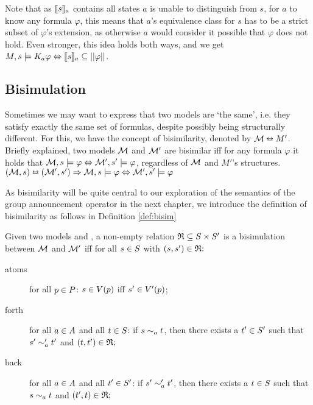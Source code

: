  Note that as $\llbracket s\rrbracket_a$ contains all states $a$ is unable to distinguish from $s$, for $a$ to know any formula $\varphi$, this means that $a$'s equivalence class for $s$ has to be a strict subset of $\varphi$'s extension, as otherwise $a$ would consider it possible that $\varphi$ does not hold. Even stronger, this idea holds both ways, and we get $M,s\models K_a\varphi \Leftrightarrow \llbracket s\rrbracket_a \subseteq ||\varphi||$.

\subsection{Bisimulation}

Sometimes we may want to express that two models are `the same', i.e. they satisfy exactly the same set of formulas, despite possibly being structurally different. For this, we have the concept of bisimilarity, denoted by $\mathcal{M} \leftrightarroweq M'$. Briefly explained, two models $\mathcal{M}$ and $\mathcal{M}'$ are bisimilar iff for any formula $\varphi$ it holds that $\mathcal{M},s\models\varphi \Leftrightarrow \mathcal{M}',s'\models\varphi$, regardless of $\mathcal{M}$ and $M'$'s structures. 
$(\mathcal{M},s) \leftrightarroweq (\mathcal{M}',s') \Rightarrow \mathcal{M},s\models\varphi \Leftrightarrow \mathcal{M}',s'\models\varphi$

As bisimilarity will be quite central to our exploration of the semantics of the group announcement operator in the next chapter, we introduce the definition of bisimilarity as follows in Definition \ref{def:bisim}

\begin{definition}[Bisimulation]\label{def:bisim}
	Given two models \model{} and , a non-empty relation $\mathfrak{R}\subseteq S \times S '$  is a bisimulation between $\mathcal{M}$ and $\mathcal{M}'$ iff for all $s \in S$ with $(s,s') \in \mathfrak{R}\mathfrak{:}$
	\begin{description}
		\item[atoms] for all $p \in P$: $s\in V(p)$ iff $s'\in V '(p)$;
		\item[forth]  for all $a \in A$ and all $t \in S$: if $s\sim_a t$, then there exists a $t'\in S '$ such that $s'\sim'_a t'$ and $(t,t')\in\mathfrak{R}\mathfrak{;}$
		\item[back] for all $a \in A$ and all $t' \in S'$: if $s'\sim'_a t'$, then there exists a $t\in S $ such that $s\sim_a t$ and $(t',t)\in\mathfrak{R}\mathfrak{;}$
	\end{description}
\end{definition} 

